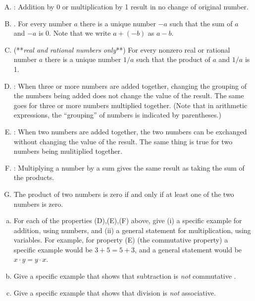 \begin{enumerate}[(A)]
\item
{}:   Addition by 0 or multiplication by 1 result in no change of original number.
\item
{}. For every number $a$ there is a unique number $-a$ such that the sum of $a$ and $-a$ is 0.   Note that we write $a + (-b)$ as $a-b$.
\item
{} (**\emph{real and rational numbers only}**)   For every nonzero real or rational number $a$ there is a unique number $1/a$ such that the product of $a$ and $1/a$ is 1.  
\item
{}: When three or more numbers are added together, changing the grouping of the numbers being added does not change the value of the result.   The same goes for three or more numbers multiplied together. (Note that in arithmetic expressions, the ``grouping'' of numbers is indicated by parentheses.)
\item
{}: When two numbers are added together, the two numbers can be exchanged without changing the value of the result. The same thing is true for two numbers being mulitiplied together.
\item
{}:   Multiplying a number by a sum gives the same result as taking the sum of the products.
\item {}
The product of two numbers is zero if and only if at least one of the two numbers is zero.
\end {enumerate}


\begin{exercise}{1}
\begin{enumerate}[(a)]
\item
For each of the properties (D),(E),(F)  above, give (i) a specific example for addition, using numbers, and (ii) a general statement for multiplication, using variables.  
For example, for property (E) (the commutative property) a specific example would be  $3+5 = 5+3$, and a general statement would be $x \cdot y=y \cdot x$. 
\item
Give a specific example  that shows that subtraction is \emph{not} commutative 
.\item
Give a specific example  that shows that division is \emph{not} associative. 
\end{enumerate}
\end{exercise}

